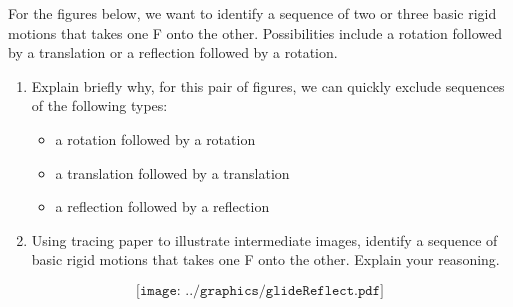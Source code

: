\newpage
\begin{prob}
For the figures below, we want to identify a sequence of two or three basic rigid motions that takes one F onto the other.  Possibilities include a rotation followed by a translation or a reflection followed by a rotation. 
\begin{enumerate}
\item Explain briefly why, for this pair of figures, we can quickly exclude sequences of the following types: 
\begin{itemize}
\item a rotation followed by a rotation
\item a translation followed by a translation
\item a reflection followed by a reflection
\end{itemize}
\item Using tracing paper to illustrate intermediate images, identify a sequence of basic rigid motions that takes one F onto the other.  Explain your reasoning.  
\end{enumerate}
\vspace{1in}
$$\texttt{[image: ../graphics/glideReflect.pdf]}$$
\end{prob}

